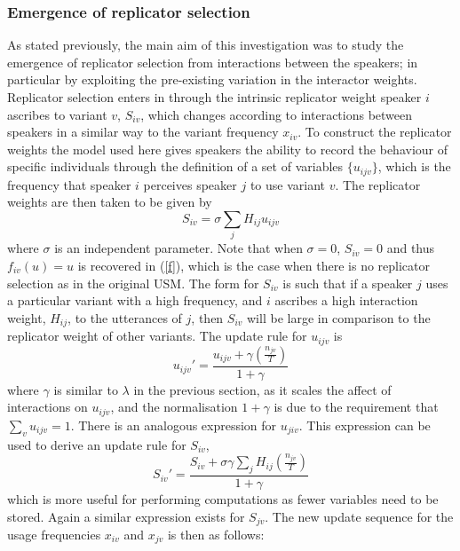 \documentclass[12pt]{article}
\begin{document}
\subsubsection{Emergence of replicator selection}
As stated previously, the main aim of this investigation was to study the emergence of replicator selection from interactions between the speakers; in particular by exploiting the pre-existing variation in the interactor weights. Replicator selection enters in through the intrinsic replicator weight speaker $i$ ascribes to variant $v$, $S_{iv}$, which changes according to interactions between speakers in a similar way to the variant frequency $x_{iv}$. To construct the replicator weights the model used here gives speakers the ability to record the behaviour of specific individuals through the definition of a set of variables $\{u_{ijv}\}$, which is the frequency that speaker $i$ perceives speaker $j$ to use variant $v$. The replicator weights are then taken to be given by
\begin{equation}
S_{iv} = \sigma \sum\limits_{j} H_{ij}u_{ijv}
\end{equation}
where $\sigma$ is an independent parameter. Note that when $\sigma = 0 $, $S_{iv} = 0$ and thus $f_{iv}(u) = u$ is recovered in (\ref{f}), which is the case when there is no replicator selection as in the original USM. The form for $S_{iv}$ is such that if a speaker $j$ uses a particular variant with a high frequency, and $i$ ascribes a high interaction weight, $H_{ij}$, to the utterances of $j$, then $S_{iv}$ will be large in comparison to the replicator weight of other variants. The update rule for $u_{ijv}$ is
\begin{equation}\label{u}
u_{ijv}' = \frac{u_{ijv} + \gamma (\frac{n_{jv}}{T})}{1 + \gamma}
\end{equation}
where $\gamma$ is similar to $\lambda$ in the previous section, as it scales the affect of interactions on $u_{ijv}$, and the normalisation $1 + \gamma$ is due to the requirement that $\sum\limits_{v} u_{ijv} = 1$. There is an analogous expression for $u_{jiv}$. This expression can be used to derive an update rule for $S_{iv}$, 
\begin{equation}\label{S}
S_{iv}' = \frac{S_{iv} + \sigma \gamma \sum\limits_{j} H_{ij}(\frac{n_{jv}}{T})}{1 + \gamma}
\end{equation}
which is more useful for performing computations as fewer variables need to be stored. Again a similar expression exists for $S_{jv}$. The new update sequence for the usage frequencies $x_{iv}$ and $x_{jv}$ is then as follows:
\end{document}
